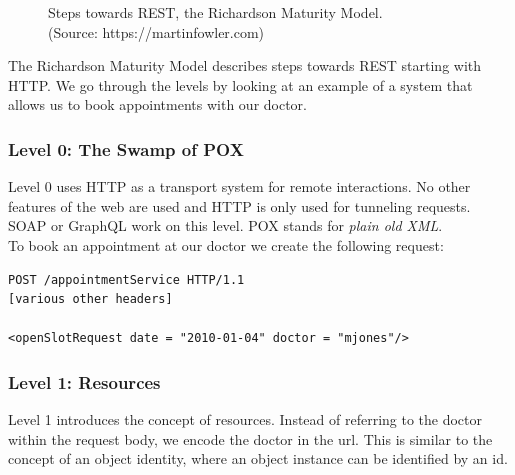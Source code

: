 \begin{figure}[!htb]
  \caption{Steps towards REST, the Richardson Maturity Model. \\ (Source: https://martinfowler.com)}
\end{figure}

The Richardson Maturity Model describes steps towards REST starting with HTTP. We go through the levels by looking at an example of a system that allows us to book appointments with our doctor.

\subsubsection{Level 0: The Swamp of POX}
Level 0 uses HTTP as a transport system for remote interactions. No other features of the web are used and HTTP is only used for tunneling requests. SOAP or GraphQL work on this level. POX stands for \textit{plain old XML}. \\
To book an appointment at our doctor we create the following request:

\lstset{language=XML}
\begin{lstlisting}[caption=Level 0: \gls{remoteprocedurecall} on HTTP]
POST /appointmentService HTTP/1.1
[various other headers]

<openSlotRequest date = "2010-01-04" doctor = "mjones"/>
\end{lstlisting}

\subsubsection{Level 1: Resources}
Level 1 introduces the concept of resources. Instead of referring to the doctor within the request body, we encode the doctor in the \gls{url}. This is similar to the concept of an object identity, where an object instance can be identified by an id.

